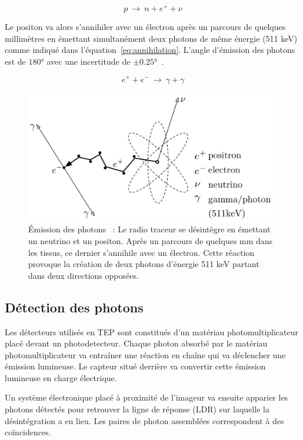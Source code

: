 \begin{equation}
 p~\rightarrow~n + e^+ + \nu
\label{eq:desinteg}
\end{equation}

Le positon va alors s'annihiler avec un électron après un parcours de quelques millimètres en émettant simultanément deux photons de même énergie (511 keV) comme indiqué dans l'équation~\ref{eq:annihilation}. L'angle d'émission des photons est de $180°$ avec une incertitude de $\pm 0.25°$~\cite{bailey2005positon}.

\begin{equation}
 e^+ + e^-~\rightarrow~\gamma + \gamma
\label{eq:annihilation}
\end{equation}

\begin{figure}
\centering
\includegraphics[width=12cm]{images/annihilation}
\caption[\'Emission des photons]{\'Emission des photons~\cite{Langner2008ad} : Le radio traceur se désintègre en émettant un neutrino et un positon. Après un parcours de quelques mm dans les tissus, ce dernier s'annihile avec un électron. Cette réaction provoque la création de deux photons d'énergie 511 keV partant dans deux directions opposées.}
\label{fig:Langner2008ad}
\end{figure}

	\subsection{Détection des photons}

Les détecteurs utilisés en TEP sont constitués d'un matériau photomultiplicateur placé devant un photodetecteur. Chaque photon absorbé par le matériau photomultiplicateur va entraîner une réaction en chaîne qui va déclencher une émission lumineuse. Le capteur situé derrière va convertir cette émission lumineuse en charge électrique.

Un système électronique placé à proximité de l'imageur va ensuite apparier les photons détectés pour retrouver la ligne de réponse (LDR) sur laquelle la désintégration a eu lieu. Les paires de photon assemblées correspondent à des coïncidences.

